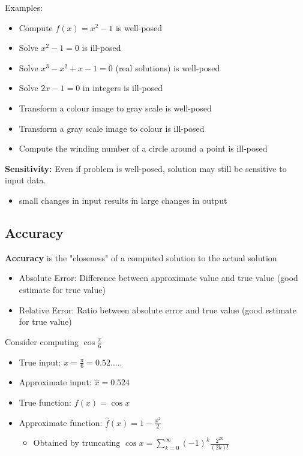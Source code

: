 \documentclass[12pt]{article}
\begin{document}
Examples:

\begin{itemize}
    \item Compute $f(x) = x^2 - 1$ is well-posed
    \item Solve $x^2 - 1 = 0$ is ill-posed
    \item Solve $x^3 - x^2 +x - 1 = 0$ (real solutions) is well-posed
    \item Solve $2x-1 = 0$ in integers is ill-posed
    \item Transform a colour image to gray scale is well-posed
    \item Transform a gray scale image to colour is ill-posed
    \item Compute the winding number of a circle around a point is ill-posed
\end{itemize}

\textbf{Sensitivity:} Even if problem is well-posed, solution may still be sensitive to input data.
\begin{itemize}
    \item small changes in input results in large changes in output
\end{itemize}

\subsection{Accuracy}

\textbf{Accuracy} is the "closeness" of a computed solution to the actual solution
\begin{itemize}
    \item Absolute Error: Difference between approximate value and true value (good estimate for true value)
    \item Relative Error: Ratio between absolute error and true value (good estimate for true value)
\end{itemize}

Consider computing $\cos \frac{\pi}{6}$
\begin{itemize}
    \item True input: $x = \frac{\pi}{6} = 0.52.....$
    \item Approximate input: $\hat{x} = 0.524$
    \item True function: $f(x) = \cos x$
    \item Approximate function: $\hat{f} (x) = 1 - \frac{x^2}{2}$
    \begin{itemize}
        \item Obtained by truncating $\cos x = \sum^\infty_{k=0} (-1)^k \frac{2^{2k}}{(2k)!}$
    \end{itemize}
\end{itemize}
\end{document}
